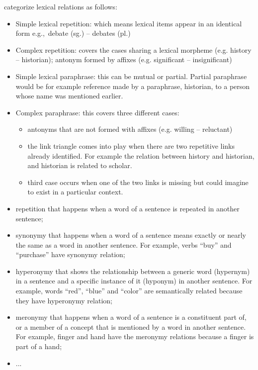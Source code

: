  categorize lexical relations as follows:
\begin{itemize}
\item Simple lexical repetition: which means lexical items appear in an identical form e.g.,\ debate (sg.) -- debates (pl.)
\item Complex repetition: covers the cases sharing a lexical morpheme (e.g. history -- historian); antonym formed by affixes (e.g. significant -- insignificant)
\item Simple lexical paraphrase: this can be mutual or partial. 
Partial paraphrase would be for example reference made by a paraphrase, historian, to a person whose name was mentioned earlier. 
\item Complex paraphrase: this covers three different cases: 
\begin{itemize}
    \item antonyms that are not formed with affixes (e.g. willing -- reluctant)
    \item the link triangle comes into play when there are two repetitive links already identified. 
    For example the relation between history and historian, and historian is related to scholar. 
    \item third case occurs when one of the two links is missing but could imagine to exist in a particular context. 
\end{itemize} 

\item repetition that happens when a word of a sentence is repeated in another sentence;

\item synonymy that happens when a word of a sentence means exactly or nearly the same as a word in another sentence. 
For example, verbs ``buy'' and ``purchase'' have synonymy relation;  

\item hyperonymy that shows the relationship between a generic word (hypernym) in a sentence and a specific instance of it (hyponym) in another sentence. 
For example, words ``red'', ``blue'' and ``color'' are semantically related because they have hyperonymy relation;

\item meronymy that happens when a word of a sentence is a constituent part of, or a member of a concept that is mentioned by a word in another sentence. 
For example, finger and hand have the meronymy relations because a finger is part of a hand;

\item ...
\end{itemize}

